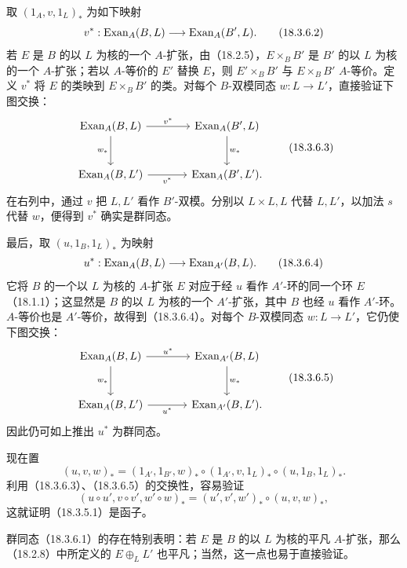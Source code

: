 取 $(1_A,v,1_L)_*$ 为如下映射
\begin{equation}
 v^*:\operatorname{Exan}_A(B,L)\longrightarrow\operatorname{Exan}_A(B',L).
 \tag{18.3.6.2}
\end{equation}
若 $E$ 是 $B$ 的以 $L$ 为核的一个 $A$-扩张，由（18.2.5），$E\times_BB'$ 是 $B'$ 的以 $L$ 为核的一个 $A$-扩张；若以 $A$-等价的 $E'$ 替换 $E$，则 $E'\times_BB'$ 与 $E\times_BB'$ $A$-等价。定义 $v^*$ 将 $E$ 的类映到 $E\times_BB'$ 的类。对每个 $B$-双模同态 $w:L\to L'$，直接验证下图交换：
\begin{equation}
\begin{tikzcd}[column sep=large,row sep=large]
\Exan_A(B,L)\arrow[r,"v^*"]\arrow[d,"w_*"']&
\Exan_A(B',L)\arrow[d,"w_*"]\\
\Exan_A(B,L')\arrow[r,"v^*"']&\Exan_A(B',L').
\end{tikzcd}
\tag{18.3.6.3}
\end{equation}
在右列中，通过 $v$ 把 $L,L'$ 看作 $B'$-双模。分别以 $L\times L,L$ 代替 $L,L'$，以加法 $s$ 代替 $w$，便得到 $v^*$ 确实是群同态。

最后，取 $(u,1_B,1_L)_*$ 为映射
\begin{equation}
 u^*:\operatorname{Exan}_A(B,L)\longrightarrow\operatorname{Exan}_{A'}(B,L).
 \tag{18.3.6.4}
\end{equation}
它将 $B$ 的一个以 $L$ 为核的 $A$-扩张 $E$ 对应于经 $u$ 看作 $A'$-环的同一个环 $E$（18.1.1）；这显然是 $B$ 的以 $L$ 为核的一个 $A'$-扩张，其中 $B$ 也经 $u$ 看作 $A'$-环。$A$-等价也是 $A'$-等价，故得到（18.3.6.4）。对每个 $B$-双模同态 $w:L\to L'$，它仍使下图交换：
\begin{equation}
\begin{tikzcd}[column sep=large,row sep=large]
\Exan_A(B,L)\arrow[r,"u^*"]\arrow[d,"w_*"']&
\Exan_{A'}(B,L)\arrow[d,"w_*"]\\
\Exan_A(B,L')\arrow[r,"u^*"']&\Exan_{A'}(B,L').
\end{tikzcd}
\tag{18.3.6.5}
\end{equation}
因此仍可如上推出 $u^*$ 为群同态。

现在置
\[
 (u,v,w)_*=(1_{A'},1_{B'},w)_*\circ(1_{A'},v,1_L)_*\circ(u,1_B,1_L)_*.
\]
利用（18.3.6.3）、（18.3.6.5）的交换性，容易验证
\[
 (u\circ u',v\circ v',w'\circ w)_*=(u',v',w')_*\circ(u,v,w)_*,
\]
这就证明（18.3.5.1）是函子。

群同态（18.3.6.1）的存在特别表明：若 $E$ 是 $B$ 的以 $L$ 为核的平凡 $A$-扩张，那么（18.2.8）中所定义的 $E\oplus_LL'$ 也平凡；当然，这一点也易于直接验证。

